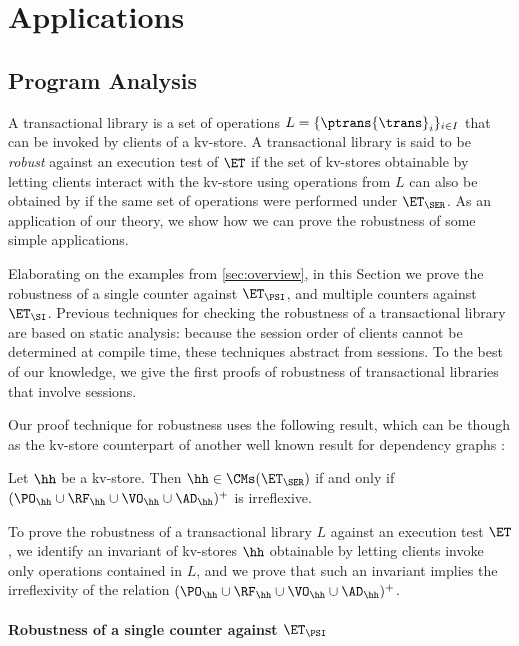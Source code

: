 \section{Applications}
\label{sec:applications}

\subsection{Program Analysis}
\label{sec:program-analysis}
A transactional library is a set of operations 
$L = \{\ptrans{\trans}_{i}\}_{i \in I}$ that can be invoked 
by clients of a kv-store. A transactional library is said to be 
\emph{robust} against an execution test of $\ET$ if the set of kv-stores 
obtainable by letting clients interact with the kv-store using 
operations from $L$ can also be obtained by if the same 
set of operations were performed under $\ET_{\SER}$.
As an application of our theory, we show how we 
can prove the robustness of some simple applications. 

Elaborating on the examples from \cref{sec:overview}, in this Section 
we prove the robustness of a single counter against $\ET_{\PSI}$, 
and multiple counters against $\ET_{\SI}$. Previous techniques for 
checking the robustness of a transactional library \cite{giovanni_concur16,SIanalysis,laws,sureshConcur} 
are based on static analysis: because the session order of clients cannot be determined at compile 
time, these techniques abstract from sessions. To the best of our knowledge, 
we give the first proofs of robustness of transactional libraries that involve sessions.

Our proof technique for robustness uses the following result, which can be though 
as the kv-store counterpart of another well known result for dependency graphs \cite{adya}:
\begin{theorem}
Let $\hh$ be a kv-store. Then $\hh \in \CMs(\ET_{\SER})$ if and only if $(\PO_{\hh} \cup \RF_{\hh} 
\cup \VO_{\hh} \cup \AD_{\hh})^{+}$ is irreflexive.
\end{theorem}
To prove the robustness of a transactional library $L$ against an execution test 
$\ET$, we identify an invariant of kv-stores $\hh$ obtainable by letting clients 
invoke only operations contained in $L$, and we prove that such an invariant 
implies the irreflexivity of the relation $(\PO_{\hh} \cup \RF_{\hh} \cup \VO_{\hh} \cup 
\AD_{\hh})^{+}$.

\paragraph{Robustness of a single counter against $\ET_{\PSI}$}

